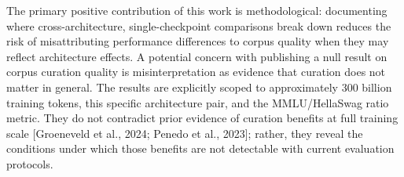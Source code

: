 The primary positive contribution of this work is methodological: documenting where cross-architecture, single-checkpoint comparisons break down reduces the risk of misattributing performance differences to corpus quality when they may reflect architecture effects. A potential concern with publishing a null result on corpus curation quality is misinterpretation as evidence that curation does not matter in general. The results are explicitly scoped to approximately 300 billion training tokens, this specific architecture pair, and the MMLU/HellaSwag ratio metric. They do not contradict prior evidence of curation benefits at full training scale [Groeneveld et al., 2024; Penedo et al., 2023]; rather, they reveal the conditions under which those benefits are not detectable with current evaluation protocols.

